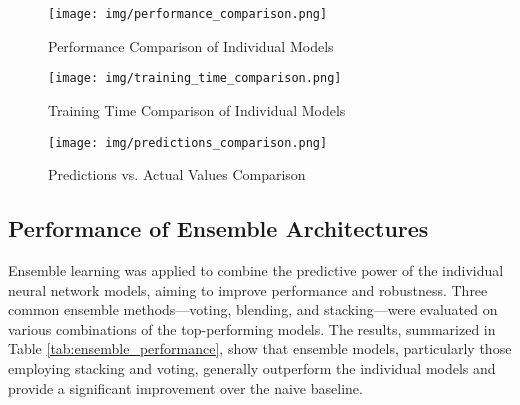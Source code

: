 \begin{figure}[h!]
\centering
\texttt{[image: img/performance\_comparison.png]}
\caption{Performance Comparison of Individual Models}
\label{fig:performance_comparison}
\end{figure}

\begin{figure}[h!]
\centering
\texttt{[image: img/training\_time\_comparison.png]}
\caption{Training Time Comparison of Individual Models}
\label{fig:training_time_comparison}
\end{figure}

\begin{figure}[h!]
\centering
\texttt{[image: img/predictions\_comparison.png]}
\caption{Predictions vs. Actual Values Comparison}
\label{fig:predictions_comparison}
\end{figure}

\subsection{Performance of Ensemble Architectures}

Ensemble learning was applied to combine the predictive power of the individual neural network models, aiming to improve performance and robustness. Three common ensemble methods—voting, blending, and stacking—were evaluated on various combinations of the top-performing models. The results, summarized in Table \ref{tab:ensemble_performance}, show that ensemble models, particularly those employing stacking and voting, generally outperform the individual models and provide a significant improvement over the naive baseline.


